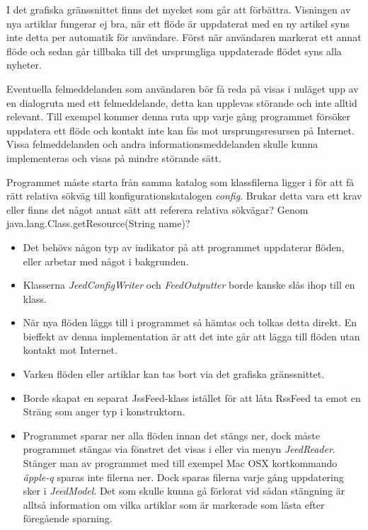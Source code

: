 \documentclass[titlepage, twoside, a4paper, 12pt]{article}
\begin{document}
I det grafiska gränssnittet finns det mycket som går att
förbättra. Visningen av nya artiklar fungerar ej bra, när ett flöde är
uppdaterat med en ny artikel syns inte detta per automatik för
användare. Först när användaren markerat ett annat flöde och sedan går
tillbaka till det ursprungliga uppdaterade flödet syns alla nyheter.

Eventuella felmeddelanden som användaren bör få reda på visas i
nuläget upp av en dialogruta med ett felmeddelande, detta kan upplevas
störande och inte alltid relevant. Till exempel kommer denna ruta upp
varje gång programmet försöker uppdatera ett flöde och kontakt inte
kan fås mot ursprungsresursen på Internet. Vissa felmeddelanden och
andra informationsmeddelanden skulle kunna implementeras och visas på
mindre störande sätt.

Programmet måste starta från samma katalog som klassfilerna ligger i
för att få rätt relativa sökväg till konfigurationskatalogen
\textit{config}. Brukar detta vara ett krav eller finns det något
annat sätt att referera relativa sökvägar? Genom
java.lang.Class.getResource(String name)?

\begin{itemize}
\item Det behövs någon typ av indikator på att programmet uppdaterar flöden,
eller arbetar med något i bakgrunden.

\item Klasserna \textit{JeedConfigWriter} och \textit{FeedOutputter} borde
kanske slås ihop till en klass.

\item När nya flöden läggs till i programmet så hämtas och tolkas detta
direkt. En bieffekt av denna implementation är att det inte går att
lägga till flöden utan kontakt mot Internet.

\item Varken flöden eller artiklar kan tas bort via det grafiska
gränssnittet.

\item Borde skapat en separat JssFeed-klass istället för att låta RssFeed ta
  emot en Sträng som anger typ i konstruktorn.

\item Programmet sparar ner alla flöden innan det stängs ner, dock
  måste programmet stängas via fönstret det visas i eller via menyn
  \textit{JeedReader}. Stänger man av programmet med till exempel Mac OSX
  kortkommando \textit{äpple-q} sparas inte filerna ner. Dock sparas
  filerna varje gång uppdatering sker i \textit{JeedModel}. Det som
  skulle kunna gå förlorat vid sådan stängning är alltså information
  om vilka artiklar som är markerade som lästa efter föregående
  sparning.
\end{itemize}
\end{document}
